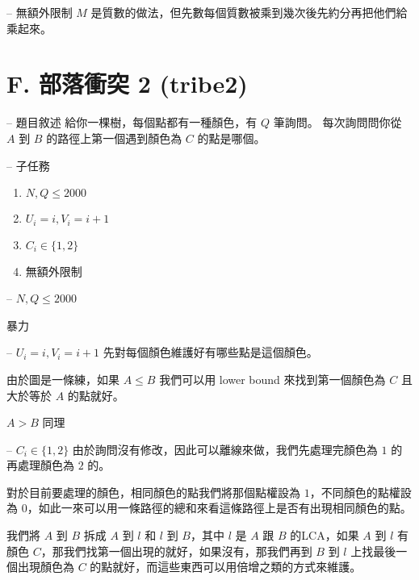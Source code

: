 \documentclass[hyperref,UTF8,notheorems,xcolor={dvipsnames}]{beamer}
\newcommand{\btitle}[1]{{\secname} -- #1}
\theoremstyle{definition}
\begin{document}
\begin{frame}[fragile]{\btitle{無額外限制}}
	$M$ 是質數的做法，但先數每個質數被乘到幾次後先約分再把他們給乘起來。
\end{frame}


\section{F. 部落衝突 2 (tribe2)}

\begin{frame}[fragile]{\btitle{題目敘述}}
	給你一棵樹，每個點都有一種顏色，有 $Q$ 筆詢問。
	每次詢問問你從 $A$ 到 $B$ 的路徑上第一個遇到顏色為 $C$ 的點是哪個。
\end{frame}

\begin{frame}[fragile]{\btitle{子任務}}
	\begin{enumerate}
		\item $N, Q \le 2000$
		\item $U_i = i, V_i = i + 1$
		\item $C_i \in \{1, 2\}$
		\item 無額外限制
	\end{enumerate}
\end{frame}

\begin{frame}[fragile]{\btitle{$N, Q \le 2000$}}

	暴力

\end{frame}

\begin{frame}[fragile]{\btitle{$U_i = i, V_i = i + 1$}}
	先對每個顏色維護好有哪些點是這個顏色。
	
	由於圖是一條練，如果 $A \le B$ 我們可以用 lower bound 來找到第一個顏色為 $C$ 且大於等於 $A$ 的點就好。 

	$A > B$ 同理

\end{frame}

\begin{frame}[fragile]{\btitle{$C_i \in \{1, 2\}$}}
	由於詢問沒有修改，因此可以離線來做，我們先處理完顏色為 $1$ 的再處理顏色為 $2$ 的。
	\pause

	對於目前要處理的顏色，相同顏色的點我們將那個點權設為 $1$，不同顏色的點權設為 $0$，如此一來可以用一條路徑的總和來看這條路徑上是否有出現相同顏色的點。
	\pause

	我們將 $A$ 到 $B$ 拆成 $A$ 到 $l$ 和 $l$ 到 $B$，其中 $l$ 是 $A$ 跟 $B$ 的LCA，如果 $A$ 到 $l$ 有顏色 $C$，那我們找第一個出現的就好，如果沒有，那我們再到 $B$ 到 $l$ 上找最後一個出現顏色為 $C$ 的點就好，而這些東西可以用倍增之類的方式來維護。
\end{frame}
\end{document}
